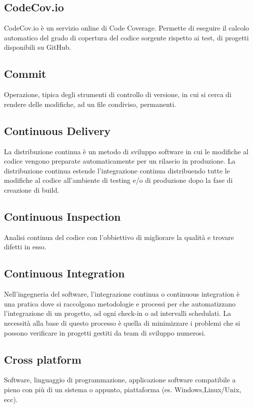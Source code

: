 \subsection{CodeCov.io}
CodeCov.io è un servizio online di Code Coverage. Permette di eseguire il calcolo automatico del grado di copertura del codice sorgente rispetto ai test, di progetti disponibili su GitHub.

\subsection{Commit}
Operazione, tipica degli strumenti di controllo di versione, in cui si cerca di rendere delle modifiche, ad un file condiviso, permanenti.

\subsection{Continuous Delivery}
La distribuzione continua è un metodo di sviluppo software in cui le modifiche al codice vengono preparate automaticamente per un rilascio in produzione. La distribuzione continua estende l'integrazione continua distribuendo tutte le modifiche al codice all'ambiente di testing e/o di produzione dopo la fase di creazione di build.

\subsection{Continuous Inspection}
Analisi continua del codice con l'obbiettivo di migliorare la qualità e trovare difetti in esso.

\subsection{Continuous Integration}
Nell'ingegneria del software, l'integrazione continua o continuous integration è una pratica dove si raccolgono metodologie e processi per che automatizzano l’integrazione di un progetto, ad ogni check-in o ad intervalli schedulati. La necessità alla base di questo processo è quella di minimizzare i problemi che si possono verificare in progetti gestiti da team di sviluppo numerosi.

\subsection{Cross platform}
Software, linguaggio di programmazione, applicazione software compatibile a pieno con più di un sistema o appunto, piattaforma (es. Windows,Linux/Unix, ecc).

